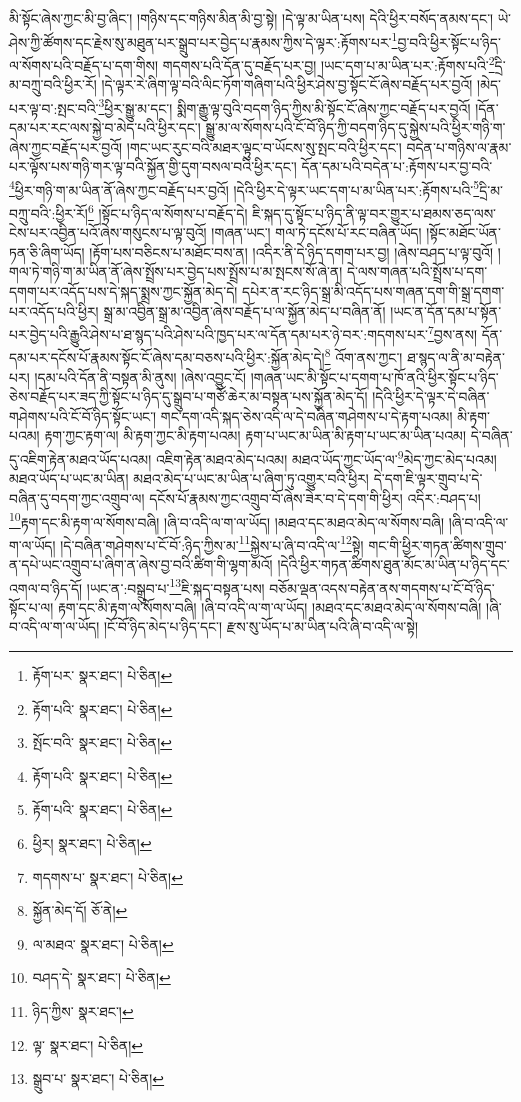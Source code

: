 མི་སྟོང་ཞེས་ཀྱང་མི་བྱ་ཞིང་། །གཉིས་དང་གཉིས་མིན་མི་བྱ་སྟེ། །དེ་ལྟ་མ་ཡིན་པས། དེའི་ཕྱིར་བསོད་ནམས་དང་། ཡེ་ཤེས་ཀྱི་ཚོགས་དང་རྗེས་སུ་མཐུན་པར་སྒྲུབ་པར་བྱེད་པ་རྣམས་ཀྱིས་དེ་ལྟར་:རྟོགས་པར་\footnote{རྟོག་པར་  སྣར་ཐང་།  པེ་ཅིན། }བྱ་བའི་ཕྱིར་སྟོང་པ་ཉིད་ལ་སོགས་པའི་བརྗོད་པ་དག་གིས། གདགས་པའི་དོན་དུ་བརྗོད་པར་བྱ། །ཡང་དག་པ་མ་ཡིན་པར་:རྟོགས་པའི་\footnote{རྟོག་པའི་  སྣར་ཐང་།  པེ་ཅིན། }དྲི་མ་བཀྲུ་བའི་ཕྱིར་རོ། །དེ་ལྟར་རེ་ཞིག་ལྟ་བའི་ལིང་ཏོག་གཞིག་པའི་ཕྱིར་ཤེས་བྱ་སྟོང་ངོ་ཞེས་བརྗོད་པར་བྱའོ། །མེད་པར་ལྟ་བ་:སྤང་བའི་\footnote{སྤོང་བའི་  སྣར་ཐང་།  པེ་ཅིན། }ཕྱིར་སྒྱུ་མ་དང་། སྨིག་རྒྱུ་ལྟ་བུའི་བདག་ཉིད་ཀྱིས་མི་སྟོང་ངོ་ཞེས་ཀྱང་བརྗོད་པར་བྱའོ། །དོན་དམ་པར་རང་ལས་སྐྱེ་བ་མེད་པའི་ཕྱིར་དང་། སྒྱུ་མ་ལ་སོགས་པའི་ངོ་བོ་ཉིད་ཀྱི་བདག་ཉིད་དུ་སྐྱེས་པའི་ཕྱིར་གཉི་ག་ཞེས་ཀྱང་བརྗོད་པར་བྱའོ། །གང་ཡང་རུང་བའི་མཐར་ལྟུང་བ་ཡོངས་སུ་སྤང་བའི་ཕྱིར་དང་། བདེན་པ་གཉིས་ལ་རྣམ་པར་ལྟོས་པས་གཉི་གར་ལྟ་བའི་སྐྱོན་གྱི་དུག་བསལ་བའི་ཕྱིར་དང་། དོན་དམ་པའི་བདེན་པ་:རྟོགས་པར་བྱ་བའི་\footnote{རྟོག་པའི་  སྣར་ཐང་།  པེ་ཅིན། }ཕྱིར་གཉི་ག་མ་ཡིན་ནོ་ཞེས་ཀྱང་བརྗོད་པར་བྱའོ། །དེའི་ཕྱིར་དེ་ལྟར་ཡང་དག་པ་མ་ཡིན་པར་:རྟོགས་པའི་\footnote{རྟོག་པའི་  སྣར་ཐང་།  པེ་ཅིན། }དྲི་མ་བཀྲུ་བའི་:ཕྱིར་རོ།\footnote{ཕྱིར།  སྣར་ཐང་།  པེ་ཅིན། } །སྟོང་པ་ཉིད་ལ་སོགས་པ་བརྗོད་དེ། ཇི་སྐད་དུ་སྟོང་པ་ཉིད་ནི་ལྟ་བར་གྱུར་པ་ཐམས་ཅད་ལས་ངེས་པར་འབྱིན་པའོ་ཞེས་གསུངས་པ་ལྟ་བུའོ། །གཞན་ཡང་། གལ་ཏེ་དངོས་པོ་རང་བཞིན་ཡོད། །སྟོང་མཐོང་ཡོན་ཏན་ཅི་ཞིག་ཡོད། །རྟོག་པས་བཅིངས་པ་མཐོང་བས་ན། །འདིར་ནི་དེ་ཉིད་དགག་པར་བྱ། །ཞེས་བཤད་པ་ལྟ་བུའོ། །གལ་ཏེ་གཉི་ག་མ་ཡིན་ནོ་ཞེས་སྤྲོས་པར་བྱེད་པས་སྤྲོས་པ་མ་སྤངས་སོ་ཞེ་ན། དེ་ལས་གཞན་པའི་སྤྲོས་པ་དག་དགག་པར་འདོད་པས་དེ་སྐད་སྨྲས་ཀྱང་སྐྱོན་མེད་དེ། དཔེར་ན་རང་ཉིད་སྒྲ་མི་འདོད་པས་གཞན་དག་གི་སྒྲ་དགག་པར་འདོད་པའི་ཕྱིར། སྒྲ་མ་འབྱིན་སྒྲ་མ་འབྱིན་ཞེས་བརྗོད་པ་ལ་སྐྱོན་མེད་པ་བཞིན་ནོ། །ཡང་ན་དོན་དམ་པ་སྟོན་པར་བྱེད་པའི་རྒྱུའི་ཤེས་པ་ཐ་སྙད་པའི་ཤེས་པའི་ཁྱད་པར་ལ་དོན་དམ་པར་ཉེ་བར་:གདགས་པར་\footnote{གདགས་པ་  སྣར་ཐང་།  པེ་ཅིན། }བྱས་ནས། དོན་དམ་པར་དངོས་པོ་རྣམས་སྟོང་ངོ་ཞེས་དམ་བཅས་པའི་ཕྱིར་:སྐྱོན་མེད་དེ།\footnote{སྐྱོན་མེད་དོ།  ཅོ་ནེ། } འོག་ནས་ཀྱང་། ཐ་སྙད་ལ་ནི་མ་བརྟེན་པར། །དམ་པའི་དོན་ནི་བསྟན་མི་ནུས། །ཞེས་འབྱུང་ངོ། །གཞན་ཡང་མི་སྟོང་པ་དགག་པ་ཁོ་ནའི་ཕྱིར་སྟོང་པ་ཉིད་ཅེས་བརྗོད་པར་ཟད་ཀྱི་སྟོང་པ་ཉིད་དུ་སྒྲུབ་པ་གཙོ་ཆེར་མ་བསྟན་པས་སྐྱོན་མེད་དོ། །དེའི་ཕྱིར་དེ་ལྟར་དེ་བཞིན་གཤེགས་པའི་ངོ་བོ་ཉིད་སྟོང་ཡང་། གང་དག་འདི་སྐད་ཅེས་འདི་ལ་དེ་བཞིན་གཤེགས་པ་དེ་རྟག་པའམ། མི་རྟག་པའམ། རྟག་ཀྱང་རྟག་ལ། མི་རྟག་ཀྱང་མི་རྟག་པའམ། རྟག་པ་ཡང་མ་ཡིན་མི་རྟག་པ་ཡང་མ་ཡིན་པའམ། དེ་བཞིན་དུ་འཇིག་རྟེན་མཐའ་ཡོད་པའམ། འཇིག་རྟེན་མཐའ་མེད་པའམ། མཐའ་ཡོད་ཀྱང་ཡོད་ལ་\footnote{ལ་མཐའ་  སྣར་ཐང་།  པེ་ཅིན། }མེད་ཀྱང་མེད་པའམ། མཐའ་ཡོད་པ་ཡང་མ་ཡིན། མཐའ་མེད་པ་ཡང་མ་ཡིན་པ་ཞིག་ཏུ་འགྱུར་བའི་ཕྱིར། དེ་དག་ཇི་ལྟར་གྲུབ་པ་དེ་བཞིན་དུ་བདག་ཀྱང་འགྲུབ་ལ། དངོས་པོ་རྣམས་ཀྱང་འགྲུབ་བོ་ཞེས་ཟེར་བ་དེ་དག་གི་ཕྱིར། འདིར་:བཤད་པ། \footnote{བཤད་དེ་  སྣར་ཐང་།  པེ་ཅིན། }རྟག་དང་མི་རྟག་ལ་སོགས་བཞི། །ཞི་བ་འདི་ལ་ག་ལ་ཡོད། །མཐའ་དང་མཐའ་མེད་ལ་སོགས་བཞི། །ཞི་བ་འདི་ལ་ག་ལ་ཡོད། །དེ་བཞིན་གཤེགས་པ་ངོ་བོ་:ཉིད་ཀྱིས་མ་\footnote{ཉིད་ཀྱིས་  སྣར་ཐང་། }སྐྱེས་པ་ཞི་བ་འདི་ལ་\footnote{ལྟ་  སྣར་ཐང་།  པེ་ཅིན། }སྟེ། གང་གི་ཕྱིར་གཏན་ཚིགས་གྲུབ་ན་དཔེ་ཡང་འགྲུབ་པ་ཞིག་ན་ཞེས་བྱ་བའི་ཚིག་གི་ལྷག་མའོ། །དེའི་ཕྱིར་གཏན་ཚིགས་ཐུན་མོང་མ་ཡིན་པ་ཉིད་དང་འགལ་བ་ཉིད་དོ། །ཡང་ན་:བསྒྲུབ་པ་\footnote{སྒྲུབ་པ་  སྣར་ཐང་།  པེ་ཅིན། }ཇི་སྐད་བསྟན་པས། བཅོམ་ལྡན་འདས་བརྟེན་ནས་གདགས་པ་ངོ་བོ་ཉིད་སྟོང་པ་ལ། རྟག་དང་མི་རྟག་ལ་སོགས་བཞི། །ཞི་བ་འདི་ལ་ག་ལ་ཡོད། །མཐའ་དང་མཐའ་མེད་ལ་སོགས་བཞི། །ཞི་བ་འདི་ལ་ག་ལ་ཡོད། །ངོ་བོ་ཉིད་མེད་པ་ཉིད་དང་། རྫས་སུ་ཡོད་པ་མ་ཡིན་པའི་ཞི་བ་འདི་ལ་སྟེ། 